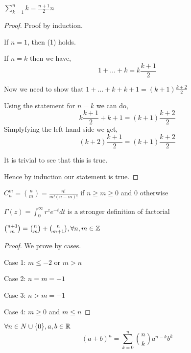 \begin{theorem}
    $\sum_{k = 1}^n k = \frac{n + 1}{2} n$
\end{theorem}
\begin{proof}
    Proof by induction.

    If $n = 1$, then (1) holds.

    If $n = k$ then we have, 
    $$ 1 + \dots + k = k \frac{k + 1}{2} $$ 

    Now we need to show that $1 + \dots + k + k + 1 = (k+1)\frac{k + 2}{2}$

    Using the statement for $n = k$ we can do,  
    $$ k \frac{k + 1}{2} + k + 1 = (k + 1) \frac{k + 2}{2} $$ 
    Simplyfying the left hand side we get, 
    $$ (k + 2) \frac{k + 1}{2} = (k + 1) \frac{k + 2}{2} $$ 

    It is trivial to see that this is true.

    Hence by induction our statement is true.

    
\end{proof}
\begin{definition}
    $C_n^m = {n \choose m} =  \frac{n!}{m! (n - m)!}$ if $n \ge m \ge 0$ and  $0$ otherwise
\end{definition}
\begin{remark}
$\Gamma(z) = \int_0^\infty r^z e^{-t} dt$ is a stronger definition of factorial
\end{remark}

\begin{theorem}
    ${n + 1 \choose m} = {n \choose m} + {n \choose m + 1}, \forall n,m \in \mathbb{Z}$ 
\end{theorem}
\begin{proof}
    We prove by cases.

    Case 1: $m \le -2$ or  $m > n$

    Case 2:  $n = m = -1$

    Case 3: $n > m = -1$

    Case 4:   $m \ge 0$ and  $m \le n$
\end{proof}


\begin{theorem}
    $\forall n \in N \cup \{0\}, a,b \in \mathbb{R}$  
    $$ (a + b)^n = \sum_{k = 0}^n {n \choose k} a^{n - k} b^k $$ 
\end{theorem}
